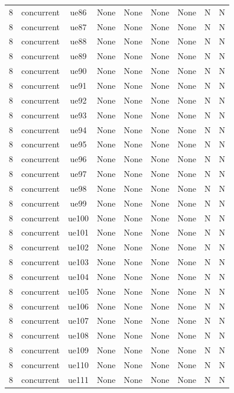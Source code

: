 \begin{table}[ht]
\begin{tabular}{|c|c|c|c|c|c|c|c|c|}
8 & concurrent & ue86 & None & None & None & None & N & N \\
8 & concurrent & ue87 & None & None & None & None & N & N \\
8 & concurrent & ue88 & None & None & None & None & N & N \\
8 & concurrent & ue89 & None & None & None & None & N & N \\
8 & concurrent & ue90 & None & None & None & None & N & N \\
8 & concurrent & ue91 & None & None & None & None & N & N \\
8 & concurrent & ue92 & None & None & None & None & N & N \\
8 & concurrent & ue93 & None & None & None & None & N & N \\
8 & concurrent & ue94 & None & None & None & None & N & N \\
8 & concurrent & ue95 & None & None & None & None & N & N \\
8 & concurrent & ue96 & None & None & None & None & N & N \\
8 & concurrent & ue97 & None & None & None & None & N & N \\
8 & concurrent & ue98 & None & None & None & None & N & N \\
8 & concurrent & ue99 & None & None & None & None & N & N \\
8 & concurrent & ue100 & None & None & None & None & N & N \\
8 & concurrent & ue101 & None & None & None & None & N & N \\
8 & concurrent & ue102 & None & None & None & None & N & N \\
8 & concurrent & ue103 & None & None & None & None & N & N \\
8 & concurrent & ue104 & None & None & None & None & N & N \\
8 & concurrent & ue105 & None & None & None & None & N & N \\
8 & concurrent & ue106 & None & None & None & None & N & N \\
8 & concurrent & ue107 & None & None & None & None & N & N \\
8 & concurrent & ue108 & None & None & None & None & N & N \\
8 & concurrent & ue109 & None & None & None & None & N & N \\
8 & concurrent & ue110 & None & None & None & None & N & N \\
8 & concurrent & ue111 & None & None & None & None & N & N \\

\end{tabular}
\end{table}
